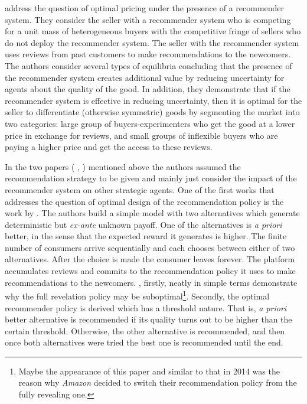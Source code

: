 \documentclass[a4paper]{article}
\begin{document}
		
		
\cite{bergemann2006optimal} address the question of optimal pricing under the presence of a recommender system. They consider the seller with a recommender system who is competing for a unit mass of heterogeneous buyers with the competitive fringe of sellers who do not deploy the recommender system. The seller with the recommender system uses reviews from past customers to make recommendations to the newcomers. The authors consider several types of equilibria concluding that the presence of the recommender system creates additional value by reducing uncertainty for agents about the quality of the good. In addition, they demonstrate that if the recommender system is effective in reducing uncertainty, then it is optimal for the seller to differentiate (otherwise symmetric) goods by segmenting the market into two categories: large group of buyers-experimenters who get the good at a lower price in exchange for reviews, and small groups of inflexible buyers who are paying a higher price and get the access to these reviews. 


In the two papers ( \cite{avery1999market}, \cite{bergemann2006optimal}) mentioned above the authors assumed the recommendation strategy to be given and mainly just consider the impact of the recommender system on other strategic agents. One of the first works that addresses the question of optimal design of the recommendation policy is the work by \cite{kremer2014}. The authors build a simple model with two alternatives which generate deterministic but \textit{ex-ante} unknown payoff. One of the alternatives is \textit{a priori} better, in the sense that the expected reward it generates is higher. The finite number of consumers arrive sequentially and each chooses between either of two alternatives. After the choice is made the consumer leaves forever. The platform accumulates reviews and commits to the recommendation policy it uses to make recommendations to the newcomers. \cite{kremer2014}, firstly, neatly in simple terms demonstrate why the full revelation policy may be suboptimal\footnote{Maybe the appearance of this paper and similar to that in 2014 was the reason why \textit{Amazon} decided to switch their recommendation policy from the fully revealing one.}. Secondly, the optimal recommender policy is derived which has a threshold nature. That is, \textit{a priori} better alternative is recommended if its quality turns out to be higher than the certain threshold. Otherwise, the other alternative is recommended, and then once both alternatives were tried the best one is recommended until the end. 
	
\end{document}

